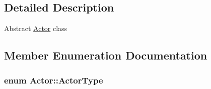 \subsection{Detailed Description}
Abstract \hyperlink{classActor}{Actor} class 

\subsection{Member Enumeration Documentation}
\subsubsection[{\texorpdfstring{Actor\+Type}{ActorType}}]{\setlength{\rightskip}{0pt plus 5cm}enum {\bf Actor\+::\+Actor\+Type}}\hypertarget{classActor_a398752837eee9970ca00a3565e52c4da}{}\label{classActor_a398752837eee9970ca00a3565e52c4da}
